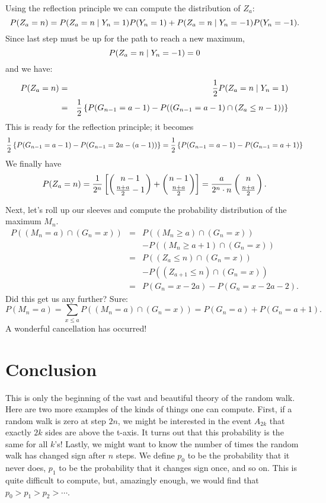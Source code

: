 Using the reflection principle we can compute the distribution of $Z_a$:
$$P(Z_a=n)=P(Z_a=n \mathrel| Y_n=1)P(Y_n=1)+P(Z_a=n \mathrel| Y_n=-1)P(Y_n=-1).$$
Since last step must be up for the path to reach a new maximum,
$$P(Z_a=n \mathrel| Y_n=-1)=0$$ and we have:
\begin{eqnarray*}
P(Z_a=n)&=&{1\over2}P(Z_a=n \mathrel| Y_n=1) \\
        &=&{1\over2}\left\{ P(G_{n-1}=a-1) - P((G_{n-1}=a-1)\cap(Z_a \le n-1))\right\}
\end{eqnarray*}
This is ready for the reflection principle; it becomes
\begin{eqnarray*}
{1\over2}\left\{ P(G_{n-1}=a-1) - P(G_{n-1}=2a-(a-1))\right\} = {1\over2}\left\{ P(G_{n-1}=a-1) - P(G_{n-1}=a+1)\right\}
\end{eqnarray*}
We finally have $$P(Z_a=n)
	 = {1\over2^n}\left[ \left( n-1 \atop {n+a\over2}-1 \right)
			   + \left( n-1 \atop {n+a\over2} \right) \right]
	 = {a \over 2^n\cdot n} \left( n \atop {n+a\over 2} \right).$$

Next, let's roll up our sleeves and compute the probability
distribution of the maximum $M_n$.
\begin{eqnarray*}
P((M_n=a)\cap(G_n=x)) &=& P((M_n\ge a)   \cap(G_n=x))\\
                      & &- P((M_n \ge a+1)\cap(G_n=x))\\
                      &=&P((Z_a \le n)\cap(G_n=x))\\
                      & &- P((Z_{a+1} \le n)\cap(G_n=x))\\
                      &=&P(G_n=x-2a) - P(G_n=x-2a-2).
\end{eqnarray*}
Did this get us any further?  Sure:
$$P(M_n=a) = \sum_{x\le a} P((M_n=a)\cap(G_n=x)) = P(G_n=a)+P(G_n=a+1).$$
A wonderful cancellation has occurred!

\section{Conclusion}\label{sec-conclu}
This is only the beginning of the vast and beautiful theory of the
random walk.  Here are two more examples of the kinds of things one
can compute.  First, if a random walk is zero at step $2n$, we might
be interested in the event $A_{2k}$ that exactly $2k$ sides are above
the t-axis.  It turns out that this probability is the same for all
$k$'s!
Lastly, we might want to know the number of times the random walk
has changed sign after $n$ steps.  We define $p_0$ to be the
probability that it never does, $p_1$ to be the probability that it
changes sign once, and so on.  This is quite difficult to compute,
but, amazingly enough, we would find that $p_0>p_1>p_2>\cdots$.

